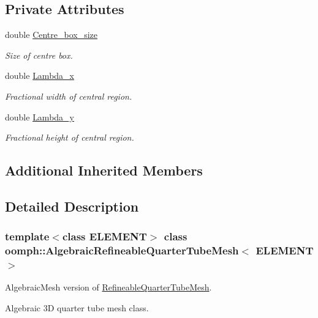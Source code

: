 \subsection*{Private Attributes}
\begin{DoxyCompactItemize}
\item 
double \hyperlink{classoomph_1_1AlgebraicRefineableQuarterTubeMesh_a6006bcac5688f832ff2b6cbaae65102a}{Centre\+\_\+box\+\_\+size}
\begin{DoxyCompactList}\small\item\em Size of centre box. \end{DoxyCompactList}\item 
double \hyperlink{classoomph_1_1AlgebraicRefineableQuarterTubeMesh_a5bb15683ec46078f9e3ab6d9caba54cf}{Lambda\+\_\+x}
\begin{DoxyCompactList}\small\item\em Fractional width of central region. \end{DoxyCompactList}\item 
double \hyperlink{classoomph_1_1AlgebraicRefineableQuarterTubeMesh_a8e3b05ebb0b69e3ca3cbedb39b5b8e47}{Lambda\+\_\+y}
\begin{DoxyCompactList}\small\item\em Fractional height of central region. \end{DoxyCompactList}\end{DoxyCompactItemize}
\subsection*{Additional Inherited Members}


\subsection{Detailed Description}
\subsubsection*{template$<$class E\+L\+E\+M\+E\+NT$>$\newline
class oomph\+::\+Algebraic\+Refineable\+Quarter\+Tube\+Mesh$<$ E\+L\+E\+M\+E\+N\+T $>$}

Algebraic\+Mesh version of \hyperlink{classoomph_1_1RefineableQuarterTubeMesh}{Refineable\+Quarter\+Tube\+Mesh}. 

Algebraic 3D quarter tube mesh class.


